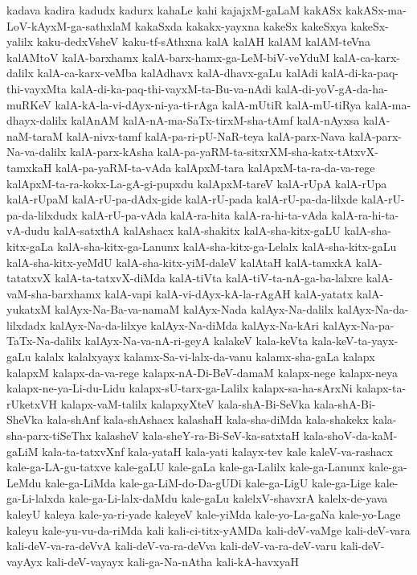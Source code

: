 {kadava
kadira
kadudx
kadurx
kahaLe
kahi
kajajxM-gaLaM
kakASx
kakASx-ma-LoV-kAyxM-ga-sathxlaM
kakaSxda
kakakx-yayxna
kakeSx
kakeSxya
kakeSx-yalilx
kaku-dedxVsheV
kaku-tf-sAthxna
kalA
kalAH
kalAM
kalAM-teVna
kalAMtoV
kalA-barxhamx
kalA-barx-hamx-ga-LeM-biV-veYduM
kalA-ca-karx-dalilx
kalA-ca-karx-veMba
kalAdhavx
kalA-dhavx-gaLu
kalAdi
kalA-di-ka-paq-thi-vayxMta
kalA-di-ka-paq-thi-vayxM-ta-Bu-va-nAdi
kalA-di-yoV-gA-da-ha-muRKeV
kalA-kA-la-vi-dAyx-ni-ya-ti-rAga
kalA-mUtiR
kalA-mU-tiRya
kalA-ma-dhayx-dalilx
kalAnAM
kalA-nA-ma-SaTx-tirxM-sha-tAmf
kalA-nAyxsa
kalA-naM-taraM
kalA-nivx-tamf
kalA-pa-ri-pU-NaR-teya
kalA-parx-Nava
kalA-parx-Na-va-dalilx
kalA-parx-kAsha
kalA-pa-yaRM-ta-sitxrXM-sha-katx-tAtxvX-tamxkaH
kalA-pa-yaRM-ta-vAda
kalApxM-tara
kalApxM-ta-ra-da-va-rege
kalApxM-ta-ra-kokx-La-gA-gi-pupxdu
kalApxM-tareV
kalA-rUpA
kalA-rUpa
kalA-rUpaM
kalA-rU-pa-dAdx-gide
kalA-rU-pada
kalA-rU-pa-da-lilxde
kalA-rU-pa-da-lilxdudx
kalA-rU-pa-vAda
kalA-ra-hita
kalA-ra-hi-ta-vAda
kalA-ra-hi-ta-vA-dudu
kalA-satxthA
kalAshacx
kalA-shakitx
kalA-sha-kitx-gaLU
kalA-sha-kitx-gaLa
kalA-sha-kitx-ga-Lanunx
kalA-sha-kitx-ga-Lelalx
kalA-sha-kitx-gaLu
kalA-sha-kitx-yeMdU
kalA-sha-kitx-yiM-daleV
kalAtaH
kalA-tamxkA
kalA-tatatxvX
kalA-ta-tatxvX-diMda
kalA-tiVta
kalA-tiV-ta-nA-ga-ba-lalxre
kalA-vaM-sha-barxhamx
kalA-vapi
kalA-vi-dAyx-kA-la-rAgAH
kalA-yatatx
kalA-yukatxM
kalAyx-Na-Ba-va-namaM
kalAyx-Nada
kalAyx-Na-dalilx
kalAyx-Na-da-lilxdadx
kalAyx-Na-da-lilxye
kalAyx-Na-diMda
kalAyx-Na-kAri
kalAyx-Na-pa-TaTx-Na-dalilx
kalAyx-Na-va-nA-ri-geyA
kalakeV
kala-keVta
kala-keV-ta-yayx-gaLu
kalalx
kalalxyayx
kalamx-Sa-vi-lalx-da-vanu
kalamx-sha-gaLa
kalapx
kalapxM
kalapx-da-va-rege
kalapx-nA-Di-BeV-damaM
kalapx-nege
kalapx-neya
kalapx-ne-ya-Li-du-Lidu
kalapx-sU-tarx-ga-Lalilx
kalapx-sa-ha-sArxNi
kalapx-ta-rUketxVH
kalapx-vaM-talilx
kalapxyXteV
kala-shA-Bi-SeVka
kala-shA-Bi-SheVka
kala-shAnf
kala-shAshacx
kalashaH
kala-sha-diMda
kala-shakekx
kala-sha-parx-tiSeThx
kalasheV
kala-sheY-ra-Bi-SeV-ka-satxtaH
kala-shoV-da-kaM-gaLiM
kala-ta-tatxvXnf
kala-yataH
kala-yati
kalayx-tev
kale
kaleV-va-rashacx
kale-ga-LA-gu-tatxve
kale-gaLU
kale-gaLa
kale-ga-Lalilx
kale-ga-Lanunx
kale-ga-LeMdu
kale-ga-LiMda
kale-ga-LiM-do-Da-gUDi
kale-ga-LigU
kale-ga-Lige
kale-ga-Li-lalxda
kale-ga-Li-lalx-daMdu
kale-gaLu
kalelxV-shavxrA
kalelx-de-yava
kaleyU
kaleya
kale-ya-ri-yade
kaleyeV
kale-yiMda
kale-yo-La-gaNa
kale-yo-Lage
kaleyu
kale-yu-vu-da-riMda
kali
kali-ci-titx-yAMDa
kali-deV-vaMge
kali-deV-vara
kali-deV-va-ra-deVvA
kali-deV-va-ra-deVva
kali-deV-va-ra-deV-varu
kali-deV-vayAyx
kali-deV-vayayx
kali-ga-Na-nAtha
kali-kA-havxyaH
}
